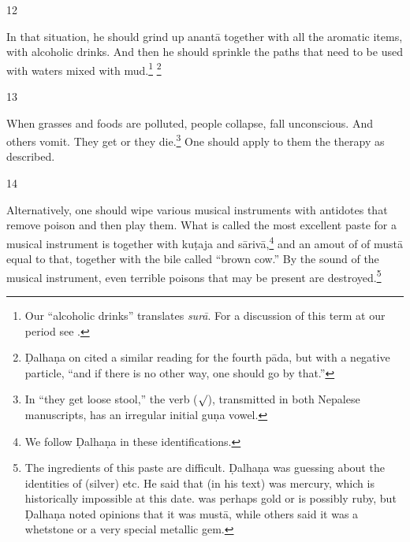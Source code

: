 \begin{translation}
\item [12]

In that situation, he should grind up \gls{anantā} together with all the aromatic
items, with alcoholic drinks.  And then  he should sprinkle the paths that need to
be used with waters mixed with mud.\footnote{Our “alcoholic drinks” translates
    \emph{surā}.  For a discussion of this term at our period see \cite[37--39
    \emph{et passim}]{mchu-2021a}.} \footnote{Ḍalhaṇa on  cited a similar reading for the fourth
        pāda, but with a negative particle,  “and if there is no other way, one should go
        by that.”}
    
    

\item [13]

When grasses and foods are polluted, people collapse, fall unconscious. And others
vomit. They get  or they die.\footnote{In “they get
loose stool,” the verb  ($\surd$), transmitted in both
Nepalese manuscripts, has an irregular initial guṇa vowel.} One should apply to them
the therapy as described.

\item [14]

Alternatively, one should wipe various musical instruments with antidotes that
remove poison and then play them.   What is called the most excellent paste for a
musical instrument is  together with
\gls{kuṭaja} and \gls{sārivā},\footnote{We follow Ḍalhaṇa in these identifications.}
and an amout of of \gls{mustā} equal to that, 
together with the bile called “brown cow.”  By the sound of the musical instrument,
even  terrible poisons that may be present are destroyed.\footnote{The ingredients
    of this paste are difficult.  Ḍalhaṇa was guessing about the identities of
     (silver) etc.   He said that  (in his text) was mercury,
    which is historically impossible at this date.   was perhaps gold or
     is possibly ruby, but Ḍalhaṇa noted opinions that it was  
    \gls{mustā}, while others said it was a whetstone or a very
special metallic gem. }

\end{translation}